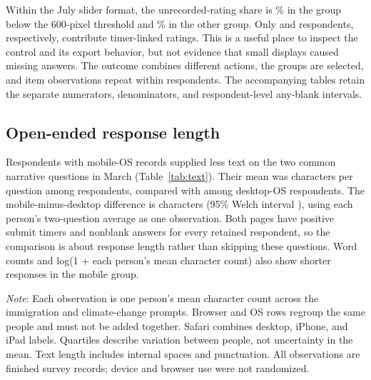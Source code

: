 \documentclass[11pt]{article}
\begin{document}
Within the July slider format, the unrecorded-rating share is \SliderNarrowRate\% in the group below the 600-pixel threshold and \SliderWideRate\% in the other group. Only \SliderNarrowN{} and \SliderWideN{} respondents, respectively, contribute timer-linked ratings. This is a useful place to inspect the control and its export behavior, but not evidence that small displays caused missing answers. The outcome combines different actions, the groups are selected, and item observations repeat within respondents. The accompanying tables retain the separate numerators, denominators, and respondent-level any-blank intervals.

\subsection{Open-ended response length}

Respondents with mobile-OS records supplied less text on the two common narrative questions in March (Table~\ref{tab:text}). Their mean was \TextMobileMean{} characters per question among \TextMobileN{} respondents, compared with \TextDesktopMean{} among \TextDesktopN{} desktop-OS respondents. The mobile-minus-desktop difference is \TextGap{} characters (95\% Welch interval \TextInterval{}), using each person's two-question average as one observation. Both pages have positive submit timers and nonblank answers for every retained respondent, so the comparison is about response length rather than skipping these questions. Word counts and log(1 + each person's mean character count) also show shorter responses in the mobile group.

\begin{table}[htbp]
\centering
\caption{Open-ended response length on common March 2017 questions.}
\label{tab:text}
\small

\par\smallskip
\begin{minipage}{\linewidth}\footnotesize
\emph{Note}: Each observation is one person's mean character count across the immigration and climate-change prompts. Browser and OS rows regroup the same people and must not be added together. Safari combines desktop, iPhone, and iPad labels. Quartiles describe variation between people, not uncertainty in the mean. Text length includes internal spaces and punctuation. All observations are finished survey records; device and browser use were not randomized.
\end{minipage}
\end{table}
\end{document}
